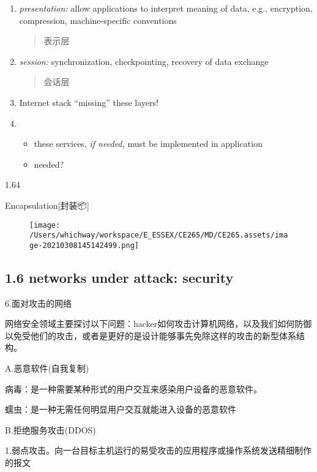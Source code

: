 \documentclass[
]{article}
\begin{document}
\begin{enumerate}
\def\labelenumi{\arabic{enumi}.}
\item
  \emph{presentation:} allow applications to interpret meaning of data,
  e.g., encryption, compression, machine-specific conventions

  \begin{quote}
  表示层
  \end{quote}
\item
  \emph{session:} synchronization, checkpointing, recovery of data
  exchange

  \begin{quote}
  会话层
  \end{quote}
\item
  Internet stack ``missing'' these layers!
\item
  \begin{itemize}
  \item
    these services, \emph{if needed,} must be implemented in application
  \item
    needed?
  \end{itemize}
\end{enumerate}

1.64

Encapsulation{[}封装📦{]}

\begin{figure}
\centering
\texttt{[image: /Users/whichway/workspace/E\_ESSEX/CE265/MD/CE265.assets/image-20210308145142499.png]}
\caption{}
\end{figure}

\hypertarget{16-networks-under-attack-security}{%
\subsection{1.6 networks under attack:
security}\label{16-networks-under-attack-security}}

6.面对攻击的网络

网络安全领域主要探讨以下问题：hacker如何攻击计算机网络，以及我们如何防御以免受他们的攻击，或者是更好的是设计能够事先免除这样的攻击的新型体系结构。

A.恶意软件(自我复制)

病毒：是一种需要某种形式的用户交互来感染用户设备的恶意软件。

蠕虫：是一种无需任何明显用户交互就能进入设备的恶意软件

B.拒绝服务攻击(DDOS)

1.弱点攻击。向一台目标主机运行的易受攻击的应用程序或操作系统发送精细制作的报文
\end{document}

